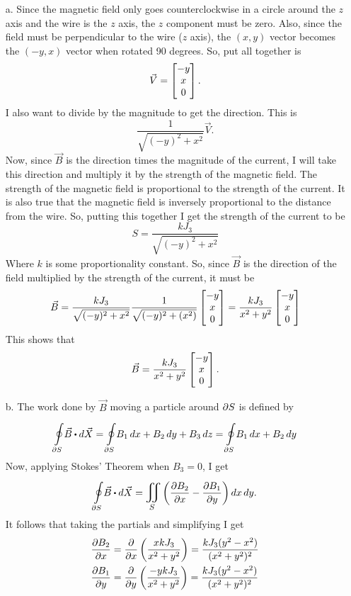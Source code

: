\documentclass[titlepage]{article}
\begin{document}
\begin{solution}
\begin{itemize}
\vspace{-2em}
\item[a.] Since the magnetic field only goes counterclockwise in a circle around the $z$ axis and the wire is the
$z$ axis, the $z$ component must be zero. Also, since the field must be perpendicular to the wire ($z$ axis),
the $(x,y)$ vector becomes the $(-y,x)$ vector when rotated 90 degrees. So, put all together is
$$ \vec{V} = \bmat{-y \\ x \\ 0}.$$
I also want to divide by the magnitude to get the direction. This is
$$ \frac{1}{\sqrt{(-y)^2 + x^2}} \vec{V}.$$
Now, since $\vec{B}$ is the direction times the magnitude of the current, I will take this direction and
multiply it by the strength of the magnetic field. The strength of the magnetic field is proportional to
the strength of the current. It is also true that the magnetic field is inversely proportional to the distance
from the wire. So, putting this together I get the strength of the current to be  
$$ S = \frac{k J_3}{\sqrt{(-y)^2 + x^2}}$$
Where $k$ is some proportionality constant. So, since $\vec{B}$ is the direction of the field multiplied by the strength of the current, it must be
$$\vec{B} = \frac{k J_3}{\sqrt{(-y)^2 + x^2}} \frac{1}{\sqrt{(-y)^2+(x^2)}}\bmat{-y \\ x \\ 0} = \frac{k J_3}{x^2 + y^2}\bmat{-y \\ x \\ 0}$$
This shows that 
$$ \vec{B} = \frac{k J_3}{x^2 + y^2}\bmat{-y \\ x \\ 0}.$$
\item[b.] The work done by $\vec{B}$ moving a particle around $\partial S$ is defined by
$$\boint{\p S}{} \vec{B} \bigcdot d\vec{X} = \boint{\p S}{} B_1\,dx + B_2\,dy + B_3\,dz = \boint{\p S}{} B_1\,dx + B_2\,dy$$ 
Now, applying Stokes' Theorem when $B_3=0$, I get
$$ \boint{\p S}{} \vec{B} \bigcdot d\vec{X} = \bigiint{S}{} \left(\frac{\p B_2}{\p x} - \frac{\p B_1}{\p y}\right)dx\,dy.$$
It follows that taking the partials and simplifying I get
\begin{align*}
\frac{\p B_2}{\p x} &= \frac{\p }{\p x}\left(\frac{xkJ_3}{x^2 + y^2}\right) = \frac{kJ_3(y^2 - x^2)}{(x^2 + y^2)^2} \\
\frac{\p B_1}{\p y} & = \frac{\p }{\p y}\left(\frac{-ykJ_3}{x^2 + y^2}\right) = \frac{kJ_3(y^2 - x^2)}{(x^2 + y^2)^2}

\end{align*}
\end{itemize}
\end{solution}
\end{document}
